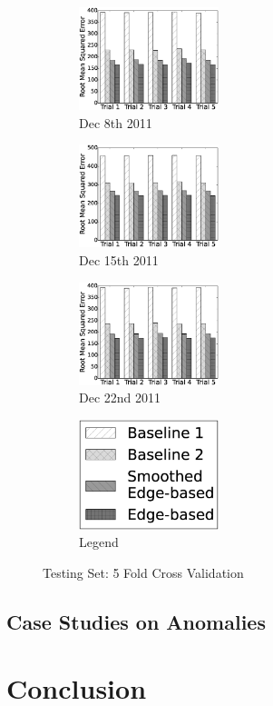 \documentclass{sig-alternate}
\begin{document}
\begin{figure}[htb]
	\centering
	\begin{subfigure}{1.6in}
		\includegraphics[width=1.6in]{20111208_test} %
		\caption{Dec 8th 2011}
		\label{fig:20111208_test}
	\end{subfigure}
	\begin{subfigure}{1.6in}
		\includegraphics[width=1.6in]{20111215_test} %
		\caption{Dec 15th 2011}
		\label{fig:20111215_test}
	\end{subfigure}
	\begin{subfigure}{1.6in}
		\includegraphics[width=1.6in]{20111222_test} %
		\caption{Dec 22nd 2011}
		\label{fig:20111222_test}
	\end{subfigure}
	\begin{subfigure}{1.6in}
		\includegraphics[width=1.6in]{legend} %
		\caption{Legend}
		\label{fig:legend_test}
	\end{subfigure}
	\caption{Testing Set: 5 Fold Cross Validation}
	\label{fig:5_fold_test}
\end{figure}

\subsection{Case Studies on Anomalies}

\section{Conclusion}



\end{document}

